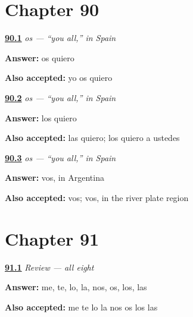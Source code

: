 \section*{Chapter 90}

\noindent\begin{minipage}[t]{\linewidth}
\raggedright
\hyperlink{review-ES-C45-os-say}{\textbf{90.1}} \emph{os — \textquotedblleft{}you all,\textquotedblright{} in Spain}\par
\small \textbf{Answer:} os quiero\par
\footnotesize \textbf{Also accepted:} yo os quiero
\end{minipage}\par\medskip

\noindent\begin{minipage}[t]{\linewidth}
\raggedright
\hyperlink{review-ES-C45-os-other}{\textbf{90.2}} \emph{os — \textquotedblleft{}you all,\textquotedblright{} in Spain}\par
\small \textbf{Answer:} los quiero\par
\footnotesize \textbf{Also accepted:} las quiero; los quiero a ustedes
\end{minipage}\par\medskip

\noindent\begin{minipage}[t]{\linewidth}
\raggedright
\hyperlink{review-ES-C45-os-vos}{\textbf{90.3}} \emph{os — \textquotedblleft{}you all,\textquotedblright{} in Spain}\par
\small \textbf{Answer:} vos, in Argentina\par
\footnotesize \textbf{Also accepted:} vos; vos, in the river plate region
\end{minipage}\par\medskip

\section*{Chapter 91}

\noindent\begin{minipage}[t]{\linewidth}
\raggedright
\hyperlink{review-ES-C45-repaso-ocho-all}{\textbf{91.1}} \emph{Review — all eight}\par
\small \textbf{Answer:} me, te, lo, la, nos, os, los, las\par
\footnotesize \textbf{Also accepted:} me te lo la nos os los las
\end{minipage}\par\medskip

